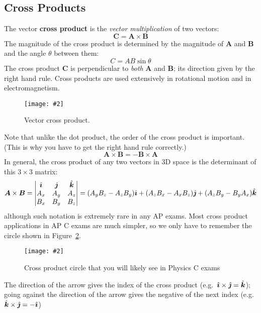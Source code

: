 \documentclass{../../oss-handout}
\newcommand{\iii}{\ensuremath\hat{\bm\imath}}
\newcommand{\jjj}{\ensuremath\hat{\bm\jmath}}
\newcommand{\kkk}{\ensuremath\hat{\bm k}}
\newcommand{\pic}[2]{\texttt{[image: \#2]}}
\begin{document}
\subsection{Cross Products}
The vector \textbf{cross product} is the \emph{vector multiplication} of two
vectors:
\begin{equation*}
  \bm{C}=\bm{A}\times\bm{B}
\end{equation*}
The magnitude of the cross product is determined by the magnitude of $\bm{A}$
and $\bm{B}$ and the angle $\theta$ between them:
\begin{equation*}
  C=AB\sin\theta
\end{equation*}
The cross product $\bm{C}$ is perpendicular to \emph{both} $\bm{A}$ and
$\bm{B}$; its direction given by the right hand rule. Cross products are used
extensively in rotational motion and in electromagnetism.
\begin{figure}[ht]
  \centering
  \pic{.3}{cross-product.png}
  \caption{Vector cross product.}
  \label{fig:cross1}
\end{figure}
Note that unlike the dot product, the order of the cross product is important.
(This is why you have to get the right hand rule correctly.)
\begin{equation*}
  \bm{A}\times\bm{B}=-\bm{B}\times\bm{A}
\end{equation*}
In general, the cross product of any two vectors in 3D space is the determinant
of this $3\times 3$ matrix:
\begin{equation*}
  \bm{A}\times\bm{B}=
  \left|
  \begin{matrix}
    \iii & \jjj & \kkk \\
    A_x & A_y & A_z\\
    B_x & B_y & B_z
  \end{matrix}
  \right|
  = (A_yB_z-A_zB_y)\iii + (A_zB_x-A_xB_z)\jjj + (A_zB_y-B_yA_x)\kkk
\end{equation*}
although such notation is extremely rare in any AP exams. Most cross product
applications in AP C exams are much simpler, so we
only have to remember the circle shown in Figure~\ref{fig:cross2}.
\begin{figure}[ht]
  \centering
  \pic{.12}{cross-product-circle.png}
  \caption{Cross product circle that you will likely see in Physics C exams}
  \label{fig:cross2}
\end{figure}

The direction of the arrow gives the index of the cross product (e.g.\
$\iii\times\jjj=\kkk$); going against the direction of the arrow gives the
negative of the next index (e.g.\ $\kkk\times\jjj=-\iii$)
\end{document}
